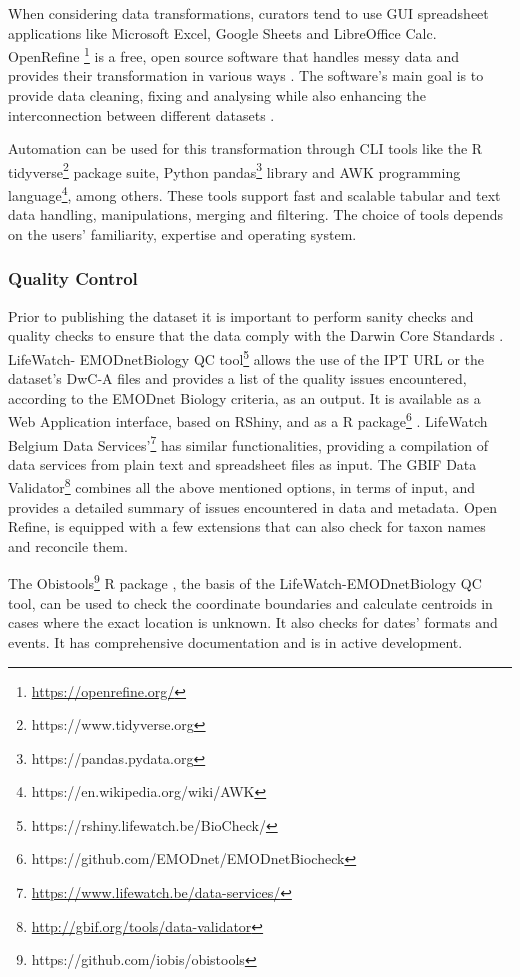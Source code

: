 When considering data transformations, curators tend to use GUI spreadsheet
applications like Microsoft Excel, Google Sheets and LibreOffice Calc.
OpenRefine \footnote{\url{https://openrefine.org/}} is a free, open source software that
handles messy data and provides their transformation in various
ways \parencite{ham_openrefine_2013}. The software’s main goal is to provide data
cleaning, fixing and analysing while also enhancing the interconnection between
different datasets \parencite{verborgh_using_2013}.

Automation can be used for this transformation through CLI tools like the R
tidyverse\footnote{https://www.tidyverse.org} package suite, Python
pandas\footnote{https://pandas.pydata.org} library and AWK programming
language\footnote{https://en.wikipedia.org/wiki/AWK}, among others. These tools
support fast and scalable tabular and text data handling, manipulations,
merging and filtering. The choice of tools depends on the users’ familiarity,
expertise and operating system.

   \subsubsection{Quality Control}
Prior to publishing the dataset it is important to perform sanity checks and
quality checks to ensure that the data comply with the Darwin Core
Standards \parencite{vandepitte_fishing_2015}. LifeWatch- EMODnetBiology QC
tool\footnote{https://rshiny.lifewatch.be/BioCheck/} allows the use of the IPT
URL or the dataset’s DwC-A files and provides a list of the quality issues
encountered, according to the EMODnet Biology criteria, as an output. It is
available as a Web Application interface, based on RShiny, and as a R
package\footnote{https://github.com/EMODnet/EMODnetBiocheck} \parencite{de_pooter_emodnetbiocheck_2019}.
LifeWatch Belgium Data Services’\footnote{\url{https://www.lifewatch.be/data-services/}}
has similar functionalities, providing a compilation of data services from
plain text and spreadsheet files as input. The GBIF Data
Validator\footnote{\url{http://gbif.org/tools/data-validator}} combines all the
above mentioned options, in terms of input, and provides a detailed summary of
issues encountered in data and metadata. Open Refine, is equipped with a few
extensions that can also check for taxon names and reconcile them.

The Obistools\footnote{https://github.com/iobis/obistools} R package \parencite{provoost_iobisobistools_2019},
the basis of the LifeWatch-EMODnetBiology QC tool, can be used to check the
coordinate boundaries and calculate centroids in cases where the exact location
is unknown. It also checks for dates’ formats and events. It has comprehensive
documentation and is in active development.

